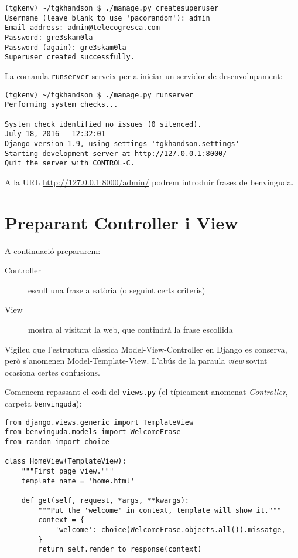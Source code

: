 \documentclass[11pt,a4paper]{article}
\begin{document}
\begin{verbatim}
(tgkenv) ~/tgkhandson $ ./manage.py createsuperuser
Username (leave blank to use 'pacorandom'): admin
Email address: admin@telecogresca.com
Password: gre3skam0la
Password (again): gre3skam0la
Superuser created successfully.
\end{verbatim}

La comanda \verb+runserver+ serveix per a iniciar un servidor de desenvolupament:

\begin{verbatim}
(tgkenv) ~/tgkhandson $ ./manage.py runserver
Performing system checks...

System check identified no issues (0 silenced).
July 18, 2016 - 12:32:01
Django version 1.9, using settings 'tgkhandson.settings'
Starting development server at http://127.0.0.1:8000/
Quit the server with CONTROL-C.
\end{verbatim}

A la URL \url{http://127.0.0.1:8000/admin/} podrem introduir frases de benvinguda.

\section{Preparant Controller i View}

A continuació prepararem:
\begin{description}
\item[Controller] escull una frase aleatòria (o seguint certs criteris)
\item[View] mostra al visitant la web, que contindrà la frase escollida
\end{description}

Vigileu que l'estructura clàssica Model-View-Controller en Django es conserva, però s'anomenen Model-Template-View. L'abús de la paraula \emph{view} sovint ocasiona certes confusions.

Comencem repassant el codi del \verb+views.py+ (el típicament anomenat \emph{Controller}, carpeta \verb+benvinguda+):

\begin{lstlisting}
from django.views.generic import TemplateView
from benvinguda.models import WelcomeFrase
from random import choice

class HomeView(TemplateView):
    """First page view."""
    template_name = 'home.html'

    def get(self, request, *args, **kwargs):
        """Put the 'welcome' in context, template will show it."""
        context = {
            'welcome': choice(WelcomeFrase.objects.all()).missatge,
        }
        return self.render_to_response(context)
\end{lstlisting}
\end{document}
